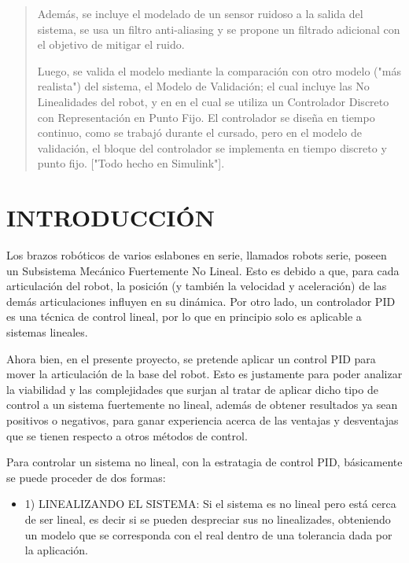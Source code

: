 \documentclass{article}
\begin{document}
\begin{sloppypar}
\begin{abstract}
    Además, se incluye el modelado de un sensor ruidoso a la salida del sistema, se usa un filtro anti-aliasing y se propone un filtrado adicional con el objetivo de mitigar el ruido.

    Luego, se valida el modelo mediante la comparación con otro modelo ("más realista") del sistema, el Modelo de Validación; el cual incluye las No Linealidades del robot, y en en el cual se utiliza un Controlador Discreto con Representación en Punto Fijo. El controlador se diseña en tiempo continuo, como se trabajó durante el cursado, pero en el modelo de validación, el bloque del controlador se implementa en tiempo discreto y punto fijo. ["Todo hecho en Simulink"].
\end{abstract}




\section{INTRODUCCIÓN}
\label{sec:INTRODUCCIÓN}

Los brazos robóticos de varios eslabones en serie, llamados robots serie, poseen un Subsistema Mecánico Fuertemente No Lineal. Esto es debido a que, para cada articulación del robot, la posición (y también la velocidad y aceleración) de las demás articulaciones influyen en su dinámica.
Por otro lado, un controlador PID es una técnica de control lineal, por lo que en principio solo es aplicable a sistemas lineales.

Ahora bien, en el presente proyecto, se pretende aplicar un control PID para mover la articulación de la base del robot. Esto es justamente para poder analizar la viabilidad y las complejidades que surjan al tratar de aplicar dicho tipo de control a un sistema fuertemente no lineal, además de obtener resultados ya sean positivos o negativos, para ganar experiencia acerca de las ventajas y desventajas que se tienen respecto a otros métodos de control.

Para controlar un sistema no lineal, con la estratagia de control PID, básicamente se puede proceder de dos formas:

\begin{itemize}
    \item 1) LINEALIZANDO EL SISTEMA: Si el sistema es no lineal pero está cerca de ser lineal, es decir si se pueden despreciar sus no linealizades, obteniendo un modelo que se corresponda con el real dentro de una tolerancia dada por la aplicación.


\end{itemize}
\end{sloppypar}
\end{document}
